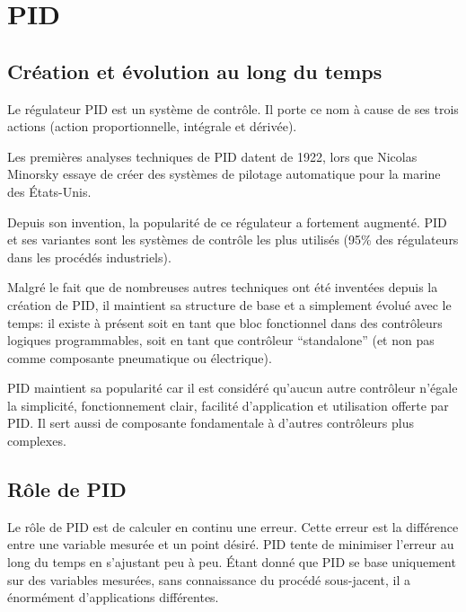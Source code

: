 
\section{PID}

\subsection{Création et évolution au long du temps}

Le régulateur PID est un système de contrôle. Il porte ce nom à cause de ses trois actions (action proportionnelle, intégrale et dérivée). 

Les premières analyses techniques de PID datent de 1922, lors que Nicolas Minorsky essaye de créer des systèmes de pilotage automatique pour la marine des États-Unis. \cite{minorsky1922directional}

Depuis son invention, la popularité de ce régulateur a fortement augmenté. \cite{ang2005pid} PID et ses variantes sont les systèmes de contrôle les plus utilisés (95\% des régulateurs dans les procédés industriels). \cite{Kinnaert2013} \cite{Astrom2002}

Malgré le fait que de nombreuses autres techniques ont été inventées depuis la création de PID, il maintient sa structure de base et a simplement évolué avec le temps: il existe à présent soit en tant que bloc fonctionnel dans des contrôleurs logiques programmables, soit en tant que contrôleur ``standalone'' (et non pas comme composante pneumatique ou électrique). \cite{visioli2006practical}

PID maintient sa popularité car il est considéré qu'aucun autre contrôleur n'égale la simplicité, fonctionnement clair, facilité d'application et utilisation offerte par PID. Il sert aussi de composante fondamentale à d'autres contrôleurs plus complexes. \cite{ang2005pid} \cite{visioli2006practical}

\subsection{Rôle de PID}

Le rôle de PID est de calculer en continu une erreur. Cette erreur est la différence entre une variable mesurée et un point désiré. PID tente de minimiser l'erreur au long du temps en s'ajustant peu à peu. Étant donné que PID se base uniquement sur des variables mesurées, sans connaissance du procédé sous-jacent, il a énormément d'applications différentes. \cite{bennett1993history}

